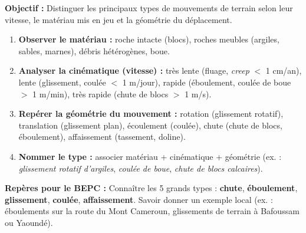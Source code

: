 \documentclass[11pt]{article}
\begin{document}
\begin{methode}
    \textbf{Objectif :} Distinguer les principaux types de mouvements de terrain selon leur vitesse, le matériau mis en jeu et la géométrie du déplacement.
    \begin{enumerate}
        \item \textbf{Observer le matériau :} roche intacte (blocs), roches meubles (argiles, sables, marnes), débris hétérogènes, boue.
        \item \textbf{Analyser la cinématique (vitesse) :} très lente (fluage, \emph{creep} $<$ 1 cm/an), lente (glissement, coulée $<$ 1 m/jour), rapide (éboulement, coulée de boue $>$ 1 m/min), très rapide (chute de blocs $>$ 1 m/s).
        \item \textbf{Repérer la géométrie du mouvement :} rotation (glissement rotatif), translation (glissement plan), écoulement (coulée), chute (chute de blocs, éboulement), affaissement (tassement, doline).
        \item \textbf{Nommer le type :} associer matériau + cinématique + géométrie (ex. : \emph{glissement rotatif d'argiles}, \emph{coulée de boue}, \emph{chute de blocs calcaires}).
    \end{enumerate}
    \textbf{Repères pour le BEPC :} Connaître les 5 grands types : \textbf{chute}, \textbf{éboulement}, \textbf{glissement}, \textbf{coulée}, \textbf{affaissement}. Savoir donner un exemple local (ex. : éboulements sur la route du Mont Cameroun, glissements de terrain à Bafoussam ou Yaoundé).
\end{methode}
\end{document}
